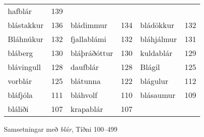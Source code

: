 \documentclass[../samsetningasafn.tex]{subfiles}
\begin{document}
\begin{wordlist}[H]
\begin{tcolorbox}
\begin{tabular}{BlBlBl}
		hafblár			& 139		\\ 	
		blástakkur		& 136		& 	
		bládimmur		& 134		& 	
		bládökkur		& 132		\\ 	
		Bláhnúkur		& 132		& 		
		fjallablámi		& 132		& 	
		bláhjálmur		& 131		\\ 	
		bláberg			& 130		& 		
		bláþráðóttur		& 130		& 	
		kuldablár		& 129		\\ 	
		blávingull		& 128		& 	
		daufblár			& 128		& 	
		Blágil			& 125		\\ 		
		vorblár			& 125		& 	
		blátunna		& 122		& 	
		blágulur			& 112		\\ 		
		bláfjóla			& 111		& 		
		bláhvolf			& 110		& 	
		blásaumur		& 109		\\ 	
		bláliði			& 107		& 		
		krapablár		& 107		& 	
						&
	\end{tabular}

\end{tcolorbox}
	\caption{Samsetningar með \textit{blár}, Tíðni 100--499}
	\label{listi:blar.100}
\end{wordlist}
\end{document}
